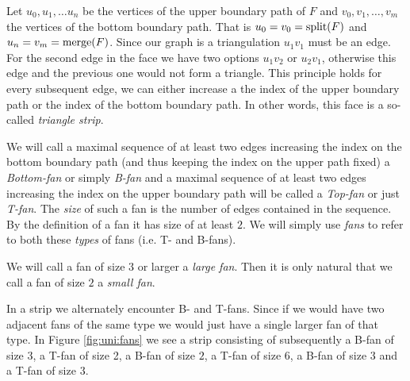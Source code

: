     Let $u_0 , u_1, \ldots u_n$ be the vertices of the upper boundary path of $F$ and $v_0, v_1, \ldots, v_m$ the vertices of the bottom boundary path. That is $u_0=v_0 = \operatorname{split}(F)$ and $u_n = v_m = \operatorname{merge}(F)$. Since our graph is a triangulation $u_1v_1$ must be an edge. For the second edge in the face we have two options $u_1v_2$ or $u_2v_1$, otherwise this edge and the previous one would not form a triangle. This principle holds for every subsequent edge, we can either increase a the index of the upper boundary path or the index of the bottom boundary path. In other words, this face is a so-called \emph{triangle strip}.

    We will call a maximal sequence of at least two edges increasing the index on the bottom boundary path (and thus keeping the index on the upper path fixed) a \emph{Bottom-fan} or simply \emph{B-fan} and a maximal sequence of at least two edges increasing the index on the upper boundary path will be called a \emph{Top-fan} or just \emph{T-fan}. The \emph{size} of such a fan is the number of edges contained in the sequence. By the definition of a fan it has size of at least $2$.
    We will simply use \emph{fans} to refer to both these \emph{types} of fans (i.e. T- and B-fans).

    We will call a fan of size $3$ or larger a \emph{large fan}. Then it is only natural that we call a fan of size $2$ a \emph{small fan}.

    In a strip we alternately encounter B- and T-fans. Since if we would have two adjacent fans of the same type we would just have a single larger fan of that type.
    In Figure \ref{fig:uni:fans} we see a strip consisting of subsequently a B-fan of size $3$, a T-fan of size 2, a B-fan of size $2$, a T-fan of size $6$, a B-fan of size $3$ and a T-fan of size $3$.

